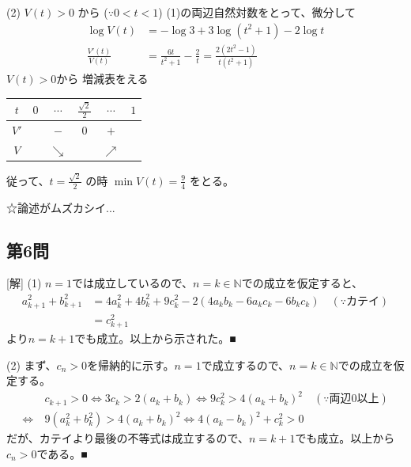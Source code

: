 \documentclass[../main.tex]{subfiles}
\begin{document}
(2) $V(t) > 0$ から ($\because 0 < t < 1$) (1)の両辺自然対数をとって、微分して
\begin{align*}
  \log V(t) &= -\log 3 + 3 \log(t^2+1) - 2 \log t \\
  \frac{V'(t)}{V(t)} &= \frac{6t}{t^2+1} - \frac{2}{t} = \frac{2(2t^2-1)}{t(t^2+1)}
\end{align*}
$V(t) > 0$から 増減表をえる
\begin{center}
  \begin{tabular}{|c|c|c|c|c|c|} \hline
    $t$ & $0$ & $\cdots$ & $\frac{\sqrt{2}}{2}$ & $\cdots$ & $1$ \\ \hline
    $V'$ & & $-$ & $0$ & $+$ & \\ \hline
    $V$ & & $\searrow$ & & $\nearrow$ & \\ \hline
  \end{tabular}
\end{center}
従って、$t = \frac{\sqrt{2}}{2}$ の時 $\min V(t) = \frac{9}{4}$ をとる。

☆論述がムズカシイ...

\begin{center}
\end{center}

\subsection*{第6問}
[解]
(1) $n=1$では成立しているので、$n=k \in \mathbb{N}$での成立を仮定すると、
\begin{align*}
  a_{k+1}^2 + b_{k+1}^2 &= 4a_k^2 + 4b_k^2 + 9c_k^2 - 2(4a_kb_k - 6a_kc_k - 6b_kc_k) \quad (\because \text{カテイ}) \\
  &= c_{k+1}^2
\end{align*}
より$n=k+1$でも成立。以上から示された。■

(2) まず、$c_n > 0$を帰納的に示す。$n=1$で成立するので、$n=k \in \mathbb{N}$での成立を仮定する。
\begin{align*}
  & c_{k+1} > 0 \Leftrightarrow 3c_k > 2(a_k+b_k) \Leftrightarrow 9c_k^2 > 4(a_k+b_k)^2 \quad (\because \text{両辺0以上}) \\
  \Leftrightarrow\ & 9(a_k^2+b_k^2) > 4(a_k+b_k)^2 \Leftrightarrow 4(a_k-b_k)^2 + c_k^2 > 0
\end{align*}
だが、カテイより最後の不等式は成立するので、$n=k+1$でも成立。以上から$c_n > 0$である。■
\end{document}
